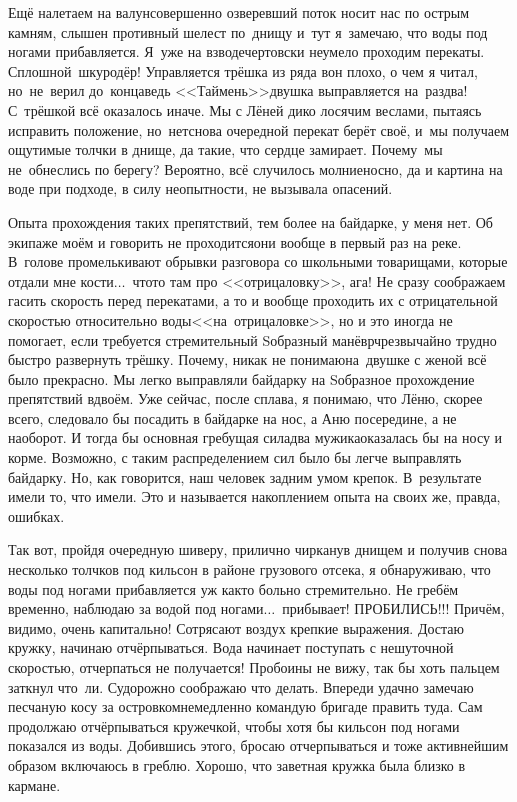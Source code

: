 Ещё налетаем на валун\mdash совершенно озверевший поток носит нас по острым камням, слышен противный шелест по~днищу и~тут я~замечаю, что воды под ногами прибавляется. Я~уже на взводе\mdash чертовски неумело проходим перекаты. Сплошной~шкуродёр! Управляется трёшка из ряда вон плохо, о чем я читал, но~не~верил до~конца\mdash ведь <<Таймень>>\sdash двушка выправляется на~раз\sdash два! С~трёшкой всё оказалось иначе. Мы с Лёней дико лосячим веслами, пытаясь исправить положение, но~нет\mdash снова очередной перекат берёт своё, и~мы получаем ощутимые толчки в днище, да такие, что сердце замирает. Почему~мы не~обнеслись по берегу? Вероятно, всё случилось молниеносно, да и картина на воде при подходе, в силу неопытности, не вызывала опасений.

Опыта прохождения таких препятствий, тем более на байдарке, у меня нет. Об экипаже моём и говорить не проходится\mdash они вообще в первый раз на реке. В~голове промелькивают обрывки разговора со школьными товарищами, которые отдали мне кости$\ldots$~что\sdash то там про <<отрицаловку>>, ага! Не сразу соображаем гасить скорость перед перекатами, а то и вообще проходить их с отрицательной скоростью относительно воды\mdash <<на~отрицаловке>>, но и это иногда не помогает, если требуется стремительный S\sdash образный манёвр\mdash чрезвычайно трудно быстро развернуть трёшку. Почему, никак не понимаю\mdash на~двушке с женой всё было прекрасно. Мы легко выправляли байдарку на S\sdash образное прохождение препятствий вдвоём. Уже сейчас, после сплава, я понимаю, что Лёню, скорее всего, следовало бы посадить в байдарке на нос, а Аню посередине, а не наоборот. И тогда бы основная гребущая сила\mdash два мужика\mdash оказалась бы на носу и корме. Возможно, с таким распределением сил было бы легче выправлять байдарку. Но, как говорится, наш человек задним умом крепок. В~результате имели то, что имели. Это и называется накоплением опыта на своих же, правда, ошибках.

Так вот, пройдя очередную шиверу, прилично чирканув днищем и получив снова несколько толчков под кильсон в районе грузового отсека, я обнаруживаю, что воды под ногами прибавляется уж как\sdash то больно стремительно. Не гребём временно, наблюдаю за водой под ногами$\ldots$~прибывает! ПРОБИЛИСЬ!!! Причём, видимо, очень капитально! Сотрясают воздух крепкие выражения. Достаю кружку, начинаю отчёрпываться. Вода начинает поступать с нешуточной скоростью, отчерпаться не получается! Пробоины не вижу, так бы хоть пальцем заткнул что~ли. Судорожно соображаю что делать. Впереди удачно замечаю песчаную косу за островком\mdash немедленно командую бригаде править туда. Сам продолжаю отчёрпываться кружечкой, чтобы хотя бы кильсон под ногами показался из воды. Добившись этого, бросаю отчерпываться и тоже активнейшим образом включаюсь в греблю. Хорошо, что заветная кружка была близко в кармане.

